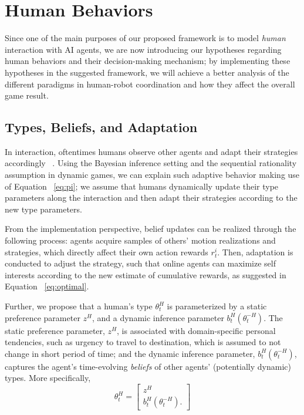 \documentclass[letterpaper, 10 pt, conference]{ieeeconf}  %
\begin{document}
\section{Human Behaviors}\label{sec:human_behavior}
Since one of the main purposes of our proposed framework is to model 
\textit{human} interaction with AI agents, we are now introducing our 
hypotheses regarding human behaviors and their decision-making mechanism; by implementing these hypotheses in the suggested framework, we will achieve a better analysis of the different paradigms in human-robot coordination and how they affect the overall game result.
\vspace{-.2em}
\subsection{Types, Beliefs, and Adaptation}\label{sec:adaptability}
\vspace{-.2em}
In interaction, oftentimes humans observe other agents and adapt their 
strategies accordingly ~\cite{nikolaidis2016formalizing,yang2017evaluating}. 
Using the Bayesian inference setting and the sequential rationality assumption 
in dynamic games, we can explain such 
adaptive behavior making use of Equation ~\ref{eq:pi}; we assume that humans 
dynamically update their type parameters along the interaction and then adapt 
their strategies according to the new type parameters. 

From the implementation perspective, belief updates can be realized through 
the following process:  agents acquire samples of others' motion realizations 
and strategies, which directly affect their own action rewards $r^i_t$. 
Then, adaptation is conducted to adjust the strategy, such that online agents 
can maximize self interests according to the new estimate of cumulative 
rewards, as suggested in Equation ~\ref{eq:optimal}. 

Further, we propose that a human's type $\theta^H_t$ is parameterized by a 
static preference parameter $z^H$, and a dynamic inference parameter 
$b^H_t(\theta^{-H}_t)$. The static preference parameter, $z^H$, is associated with 
domain-specific personal 
tendencies, such as urgency to travel to destination, which is assumed to not 
change in short period of time; and the 
dynamic inference parameter, $b^H_t(\theta^{-H}_t)$, captures the agent's 
time-evolving \textit{beliefs} of other agents' (potentially dynamic) types. More specifically,
\begin{equation}
  \theta^H_t = \begin{bmatrix}
    z^H \\
    b^H_t(\theta^{-H}_t).
  \end{bmatrix}
\end{equation}
\end{document}
